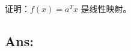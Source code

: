 \begin{example}[线性映射验证]
    证明：\(f(x) = a^T x\) 是线性映射。
    \end{example}
    
    \subsection*{Ans:}
    